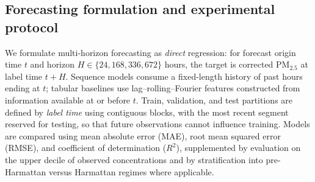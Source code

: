 \documentclass[a4paper,fleqn]{cas-sc}
\begin{document}
\subsection{Forecasting formulation and experimental protocol}
We formulate multi-horizon forecasting as \emph{direct} regression: for forecast origin time $t$ and horizon $H \in \{24,168,336,672\}$ hours, the target is corrected PM$_{2.5}$ at label time $t+H$. Sequence models consume a fixed-length history of past hours ending at $t$; tabular baselines use lag--rolling--Fourier features constructed from information available at or before $t$. Train, validation, and test partitions are defined by \emph{label time} using contiguous blocks, with the most recent segment reserved for testing, so that future observations cannot influence training. Models are compared using mean absolute error (MAE), root mean squared error (RMSE), and coefficient of determination ($R^2$), supplemented by evaluation on the upper decile of observed concentrations and by stratification into pre-Harmattan versus Harmattan regimes where applicable.
\end{document}
